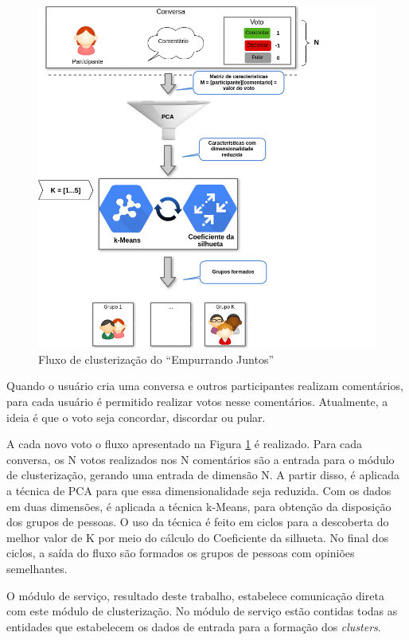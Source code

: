 \begin{figure}[h!]
\centering
\includegraphics[scale=0.7]{figuras/resumo_clusterizao_ej.png}
\caption{Fluxo de clusterização do ``Empurrando Juntos''}
\label{fig:resumo_clusterizao_ej}
\end{figure}

Quando o usuário cria uma conversa e outros participantes realizam comentários, para cada usuário é permitido realizar votos nesse comentários.
Atualmente, a ideia é que o voto seja concordar, discordar ou pular. 

\vfill 
\pagebreak
A cada novo voto o fluxo apresentado na Figura \ref{fig:resumo_clusterizao_ej} é
realizado. Para cada conversa, os N votos realizados nos N comentários são a entrada para o módulo de clusterização, 
gerando uma entrada de dimensão N. A partir disso, é aplicada a técnica de PCA para que
essa dimensionalidade seja reduzida. Com os dados em duas dimensões, é aplicada
a técnica k-Means, para obtenção da disposição dos grupos de pessoas. O uso da técnica é
feito em ciclos para a descoberta do melhor valor de K por meio do cálculo do Coeficiente da silhueta.
No final dos ciclos, a saída do fluxo são formados os grupos de pessoas com opiniões semelhantes.

O módulo de serviço, resultado deste trabalho, estabelece comunicação direta com este módulo de clusterização. 
No módulo de serviço estão contidas todas as entidades que estabelecem os dados de entrada para a formação dos \textit{clusters}.






